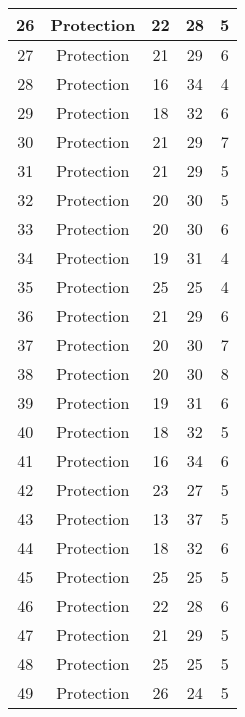 \documentclass[results.tex]{subfiles}
\begin{document}
\begin{center}
\begin{tabular}{| c || c | c | c | c |}
    \hline
    26 & Protection & 22 & 28 & 5 \\ 
    \hline
    27 & Protection & 21 & 29 & 6 \\ 
    \hline
    28 & Protection & 16 & 34 & 4 \\ 
    \hline
    29 & Protection & 18 & 32 & 6 \\ 
    \hline
    30 & Protection & 21 & 29 & 7 \\ 
    \hline
    31 & Protection & 21 & 29 & 5 \\ 
    \hline
    32 & Protection & 20 & 30 & 5 \\ 
    \hline
    33 & Protection & 20 & 30 & 6 \\ 
    \hline
    34 & Protection & 19 & 31 & 4 \\ 
    \hline
    35 & Protection & 25 & 25 & 4 \\ 
    \hline
    36 & Protection & 21 & 29 & 6 \\ 
    \hline
    37 & Protection & 20 & 30 & 7 \\ 
    \hline
    38 & Protection & 20 & 30 & 8 \\ 
    \hline
    39 & Protection & 19 & 31 & 6 \\ 
    \hline
    40 & Protection & 18 & 32 & 5 \\ 
    \hline
    41 & Protection & 16 & 34 & 6 \\ 
    \hline
    42 & Protection & 23 & 27 & 5 \\ 
    \hline
    43 & Protection & 13 & 37 & 5 \\ 
    \hline
    44 & Protection & 18 & 32 & 6 \\ 
    \hline
    45 & Protection & 25 & 25 & 5 \\ 
    \hline
    46 & Protection & 22 & 28 & 6 \\ 
    \hline
    47 & Protection & 21 & 29 & 5 \\ 
    \hline
    48 & Protection & 25 & 25 & 5 \\ 
    \hline
    49 & Protection & 26 & 24 & 5 \\ 
    \hline   \end{tabular}
\end{center}
\end{document}
